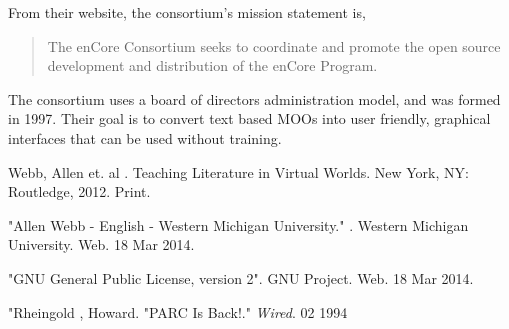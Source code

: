 \documentclass[12pt, letterpaper]{report}
\begin{document}
	\par 
	From their website, the consortium's mission statement is,
	
	\begin{quotation}
	The enCore Consortium seeks to coordinate and promote the open source development and distribution of the enCore Program.
	\end{quotation}
	
	\par
    The consortium uses a board of directors administration model, and was formed in 1997. Their goal is to convert text based MOOs into user friendly, graphical interfaces that can be used without training.

	\printglossary
	\begin{thebibliography}{9}

 	Webb, Allen et. al . Teaching Literature in Virtual Worlds. New York, NY: Routledge, 2012. Print.

    "Allen Webb - English - Western Michigan University." . Western Michigan University. Web. 18 Mar 2014. \\
    
    "GNU General Public License, version 2". GNU Project. Web. 18 Mar 2014. \\
	
	
	"Rheingold , Howard. "PARC Is Back!." \textit{Wired}. 02 1994 \\

	\end{thebibliography}
	
\end{document}
